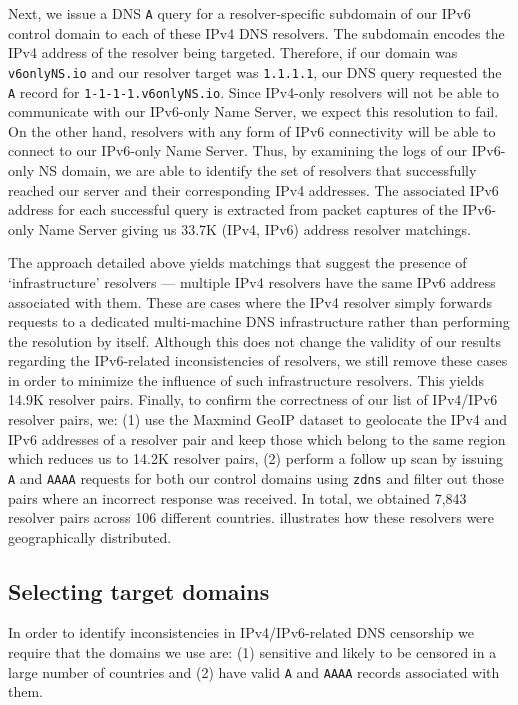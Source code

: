 Next, we issue a DNS {\tt A} query for a resolver-specific subdomain of our
IPv6 control domain to each of these IPv4 DNS resolvers. The subdomain encodes
the IPv4 address of the resolver being targeted. Therefore, if our domain was
{\tt v6onlyNS.io} and our resolver target was {\tt 1.1.1.1}, our DNS query
requested the {\tt A} record for {\tt 1-1-1-1.v6onlyNS.io}.
%
Since IPv4-only resolvers will not be able to communicate with our IPv6-only
Name Server, we expect this resolution to fail. On the other hand, resolvers
with any form of IPv6 connectivity will be able to connect to our IPv6-only
Name Server.
%
Thus, by examining the logs of our IPv6-only NS domain, we are able
to identify the set of resolvers that successfully reached our server and
their corresponding IPv4 addresses. The associated IPv6 address for each
successful query is extracted from packet captures of the IPv6-only Name
Server giving us 33.7K (IPv4, IPv6) address resolver matchings.

The approach detailed above yields matchings that suggest the presence of
`infrastructure' resolvers --- \eg multiple IPv4 resolvers have the same IPv6
address associated with them. These are cases where the IPv4 resolver simply
forwards requests to a dedicated multi-machine DNS infrastructure rather than
performing the resolution by itself. Although this does not change the validity
of our results regarding the IPv6-related inconsistencies of resolvers, we
still remove these cases in order to minimize the influence of such
infrastructure resolvers. This yields 14.9K resolver pairs.
%
Finally, to confirm the correctness of our list of IPv4/IPv6 resolver pairs, we:
(1) use the Maxmind GeoIP dataset \cite{maxmind-connectiondb} to geolocate the
IPv4 and IPv6 addresses of a resolver pair and keep those which belong to the
same region which reduces us to 14.2K resolver pairs, (2) perform a follow up
scan by issuing {\tt A} and {\tt AAAA} requests for both our control domains
using {\tt zdns} \cite{Durumeric13zmap} and filter out those pairs where an
incorrect response was received.
% 
In total, we obtained 7,843 resolver pairs across 106 different countries.
 illustrates how these resolvers were geographically
distributed.


\subsection{Selecting target domains}
\label{sec:methodology:domains}
In order to identify inconsistencies in IPv4/IPv6-related DNS censorship we
require that the domains we use are: (1) sensitive and likely to be censored in
a large number of countries and (2) have valid {\tt A} and {\tt AAAA} records
associated with them.

